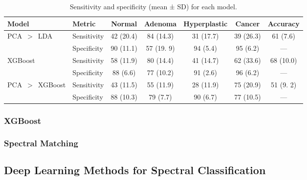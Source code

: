 \begin{table}[ht] \centering \caption{Sensitivity and specificity (mean ± SD)
for each model.} \label{tab:model_performance} \begin{tabular}{@{}l l c c c c
c@{}} \toprule Model & Metric & Normal & Adenoma & Hyperplastic & Cancer &
Accuracy \\ \midrule \multirow{2}{*}{PCA~$>$~LDA} & Sensitivity & 42 (20.4) & 84
(14.3) & 31 (17.7) & 39 (26.3) & 61 (7.6) \\ & Specificity & 90 (11.1) & 57 (19.
9) & 94 (5.4) & 95 (6.2) & — \\ \midrule \multirow{2}{*}{XGBoost} & Sensitivity
& 58 (11.9) & 80 (14.4) & 41 (14.7) & 62 (33.6) & 68 (10.0) \\ & Specificity &
88 (6.6) & 77 (10.2) & 91 (2.6) & 96 (6.2) & — \\ \midrule \multirow{2}{*}{PCA~$>$~XGBoost} & Sensitivity & 43 (11.5) & 55 (11.9) & 28 (11.9) & 75 (20.9) & 51 (9.
2) \\ & Specificity & 88 (10.3) & 79 (7.7) & 90 (6.7) & 77 (10.5) & — \\
\bottomrule \end{tabular} \end{table}


\subsubsection{XGBoost}
\subsubsection{Spectral Matching}


\subsection{Deep Learning Methods for Spectral Classification}

